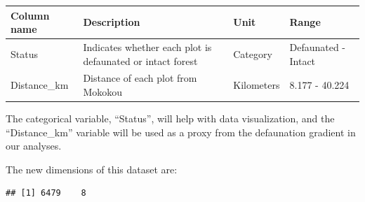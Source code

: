 \documentclass[
  12pt,
]{article}
\begin{document}
\begin{longtable}[]{@{}llll@{}}
\toprule
\begin{minipage}[b]{0.22\columnwidth}\raggedright
Column name\strut
\end{minipage} & \begin{minipage}[b]{0.32\columnwidth}\raggedright
Description\strut
\end{minipage} & \begin{minipage}[b]{0.17\columnwidth}\raggedright
Unit\strut
\end{minipage} & \begin{minipage}[b]{0.17\columnwidth}\raggedright
Range\strut
\end{minipage}\tabularnewline
\midrule
\endhead
\begin{minipage}[t]{0.22\columnwidth}\raggedright
Status\strut
\end{minipage} & \begin{minipage}[t]{0.32\columnwidth}\raggedright
Indicates whether each plot is defaunated or intact forest\strut
\end{minipage} & \begin{minipage}[t]{0.17\columnwidth}\raggedright
Category\strut
\end{minipage} & \begin{minipage}[t]{0.17\columnwidth}\raggedright
Defaunated - Intact\strut
\end{minipage}\tabularnewline
\begin{minipage}[t]{0.22\columnwidth}\raggedright
Distance\_km\strut
\end{minipage} & \begin{minipage}[t]{0.32\columnwidth}\raggedright
Distance of each plot from Mokokou\strut
\end{minipage} & \begin{minipage}[t]{0.17\columnwidth}\raggedright
Kilometers\strut
\end{minipage} & \begin{minipage}[t]{0.17\columnwidth}\raggedright
8.177 - 40.224\strut
\end{minipage}\tabularnewline
\bottomrule
\end{longtable}

The categorical variable, ``Status'', will help with data visualization,
and the ``Distance\_km'' variable will be used as a proxy from the
defaunation gradient in our analyses.

The new dimensions of this dataset are:

\begin{verbatim}
## [1] 6479    8
\end{verbatim}
\end{document}
